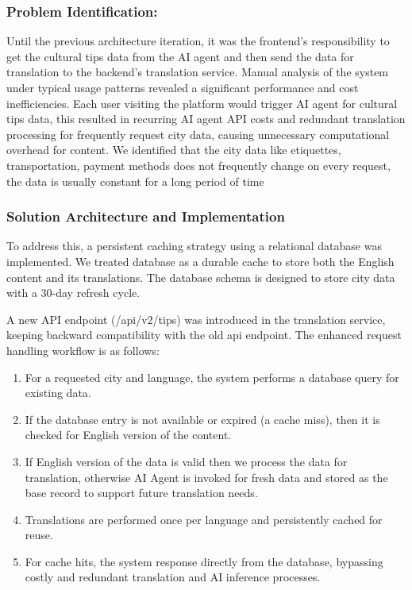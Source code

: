 \subsubsection{Problem Identification:} 
Until the previous architecture iteration, it was the frontend's responsibility to get the cultural tips data from the AI agent and then send the data for translation to the backend's translation service. Manual analysis of the system under typical usage patterns revealed a significant performance and cost inefficiencies. Each user visiting the platform would trigger AI agent for cultural tips data, this resulted in recurring AI agent API costs and redundant translation processing for frequently request city data, causing unnecessary computational overhead for content. We identified that the city data like etiquettes, transportation, payment methods does not frequently change on every request, the data is usually constant for a long period of time\cite{govuk2020bus,bagheri2023global,zhang2021urban,tussey2025principles}

\subsubsection{Solution Architecture and Implementation}

To address this, a persistent caching strategy using a relational database was implemented. We treated database as a durable cache to store both the English content and its translations. The database schema is designed to store city data with a 30-day refresh cycle. 

A new API endpoint (/api/v2/tips) was introduced in the translation service, keeping backward compatibility with the old api endpoint. The enhanced request handling workflow is as follows:
\begin{enumerate} \itemsep0pt \parskip0pt
    \item For a requested city and language, the system performs a database query for existing data.
    \item If the database entry is not available or expired (a cache miss), then it is checked for English version of the content.
    \item If English version of the data is valid then we process the data for translation, otherwise AI Agent is invoked for fresh data and stored as the base record to support future translation needs.
    \item Translations are performed once per language and persistently cached for reuse.
    \item For cache hits, the system response directly from the database, bypassing costly and redundant translation and AI inference processes.
\end{enumerate}

